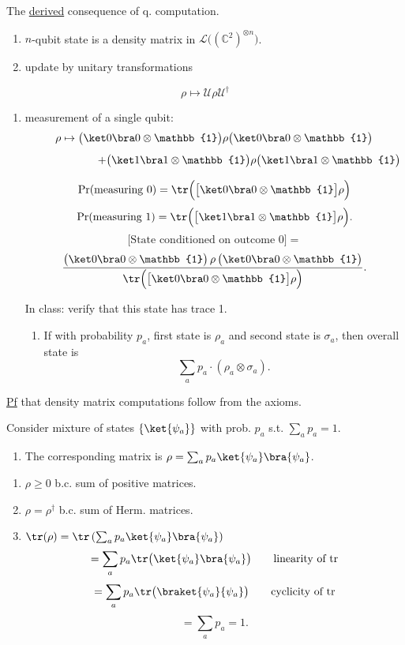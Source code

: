 \documentclass[11pt]{article}
\begin{document}
The \underline{derived} consequence of q. computation.
\begin{enumerate}
    \item[\textcircled{1}] $n$-qubit state is a density matrix in $\mathcal{L}\big((\mathbb{C}^2)^{\otimes n}\big)$.
    \item[\textcircled{2}] update by unitary transformations
\end{enumerate}
\[
\rho \mapsto \mathcal{U}\rho\mathcal{U}^\dagger
\]
\begin{enumerate}
    \item[\textcircled{3}] measurement of a single qubit:
\[
\rho \mapsto \big(\ket0\bra0\otimes\mathbb{1}\big)\rho\big(\ket0\bra0\otimes\mathbb{1}\big)
\]
\[
\hspace{2.2cm} + \big(\ket1\bra1\otimes\mathbb{1}\big)\rho\big(\ket1\bra1\otimes\mathbb{1}\big)
\]

\[
\Pr(\text{measuring } 0) = \tr\Big(\big[\ket0\bra0\otimes\mathbb{1}\big]\rho\Big)
\]
\[
\Pr(\text{measuring } 1) = \tr\Big(\big[\ket1\bra1\otimes\mathbb{1}\big]\rho\Big).
\]
\[
\Big[\text{State conditioned on outcome } 0\Big] =
\]
\[
\frac{\big(\ket0\bra0\otimes\mathbb{1}\big)\,\rho\,\big(\ket0\bra0\otimes\mathbb{1}\big)}{\tr\Big(\big[\ket0\bra0\otimes\mathbb{1}\big]\rho\Big)}.
\]

In class: verify that this state has trace 1.
\begin{enumerate}
    \item[\textcircled{4}] If with probability $p_a$, first state is $\rho_a$ and second state is $\sigma_a$, then overall state is
\[
\sum_a p_a\cdot(\rho_a\otimes\sigma_a).
\]
\end{enumerate}
\end{enumerate}

\underline{Pf} that density matrix computations follow from the axioms.

Consider mixture of states $\{\ket{\psi_a}\}$ with prob. $p_a$ s.t. $\sum_a p_a = 1$.
\begin{enumerate}
    \item[\textcircled{1}] The corresponding matrix is $\rho = \sum_a p_a\ket{\psi_a}\bra{\psi_a}$.
\end{enumerate}

\begin{enumerate}
    \item[\textcircled{1}] $\rho\geq0$ b.c. sum of positive matrices.
    \item[\textcircled{2}] $\rho=\rho^\dagger$ b.c. sum of Herm. matrices.
    \item[\textcircled{3}] $\tr(\rho) = \tr\left(\sum_a p_a\ket{\psi_a}\bra{\psi_a}\right)$
    \[
    = \sum_a p_a \tr\big(\ket{\psi_a}\bra{\psi_a}\big) \qquad \text{linearity of tr}
    \]
    \[
    = \sum_a p_a \tr\big(\braket{\psi_a}{\psi_a}\big) \qquad \text{cyclicity of tr}
    \]
    \[
    = \sum_a p_a = 1.
    \]
\end{enumerate}
\end{document}
